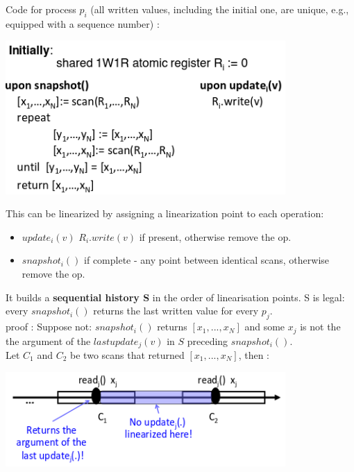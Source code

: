 \documentclass{article}
\theoremstyle{definition}
\begin{document}
Code for process $p_i$ (all written values, including the initial one, are unique, e.g., equipped with a sequence number) :

\begin{center}
\includegraphics[width=0.8\textwidth]{lock_free_snapshot}\\
\end{center}

This can be linearized by assigning a linearization point to each operation:
\begin{itemize}
	\item $update_i(v)$ $R_i.write(v)$ if present, otherwise remove the op.
	\item $snapshot_i()$ if complete - any point between identical scans, otherwise remove the op.
\end{itemize}
It builds a \textbf{sequential history S} in the order of linearisation points.
S is legal: every $snapshot_i()$ returns the last written value for every $p_j$.\\
proof : Suppose not: $snapshot_i()$ returns $[x_1,...,x_N]$ and some $x_j$ is not the the argument of the $last update_j(v)$ in $S$ preceding $snapshot_i()$.\\

Let $C_1$ and $C_2$ be two scans that returned $[x_1,...,x_N]$, then :

\begin{center}
\includegraphics[width=0.8\textwidth]{lin_lock_free_snapshot}\\
\end{center}
\end{document}
